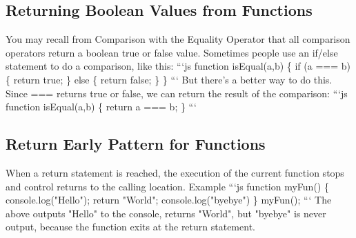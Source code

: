 \documentclass{article}%
\begin{document}
%
\subsection{Returning Boolean Values from Functions}%
\label{subsec:ReturningBooleanValuesfromFunctions}%
You may recall from Comparison with the Equality Operator that all comparison operators return a boolean true or false value.\newline%
Sometimes people use an if/else statement to do a comparison, like this:\newline%
```js\newline%
function isEqual(a,b) \{\newline%
  if (a === b) \{\newline%
    return true;\newline%
  \} else \{\newline%
    return false;\newline%
  \}\newline%
\}\newline%
```\newline%
But there's a better way to do this. Since === returns true or false, we can return the result of the comparison:\newline%
```js\newline%
function isEqual(a,b) \{\newline%
  return a === b;\newline%
\}\newline%
```\newline%

%
\subsection{Return Early Pattern for Functions}%
\label{subsec:ReturnEarlyPatternforFunctions}%
When a return statement is reached, the execution of the current function stops and control returns to the calling location.\newline%
Example\newline%
```js\newline%
function myFun() \{\newline%
  console.log("Hello");\newline%
  return "World";\newline%
  console.log("byebye")\newline%
\}\newline%
myFun();\newline%
```\newline%
The above outputs "Hello" to the console, returns "World", but "byebye" is never output, because the function exits at the return statement.\newline%
\end{document}
